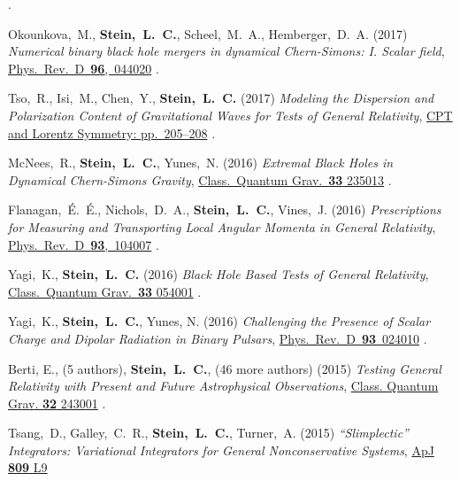 \begin{etaremune}[start=\value{pubCounter}]
  .
\item
  Okounkova,~M.,
  {\bf Stein,~L.~C.},
  Scheel,~M.~A.,
  Hemberger,~D.~A.
  (2017)
  {\it Numerical binary black hole mergers in dynamical Chern-Simons:
    I. Scalar field},
  \href{https://doi.org/10.1103/PhysRevD.96.044020}{Phys.~Rev.~D~{\bf 96},~044020}
  .
\item
  Tso,~R., Isi,~M., Chen,~Y., {\bf Stein,~L.~C.}
  (2017)
  {\it Modeling the Dispersion and Polarization Content of
    Gravitational Waves for Tests of General Relativity},
  \href{http://dx.doi.org/10.1142/9789813148505_0052}{CPT and Lorentz Symmetry: pp.~205--208}
  .
\item
  McNees,~R., {\bf Stein,~L.~C.}, Yunes,~N.
  (2016)
  {\it Extremal Black Holes in Dynamical Chern-Simons Gravity},
  \href{http://dx.doi.org/10.1088/0264-9381/33/23/235013}{Class.~Quantum Grav.~{\bf 33} 235013}
  .
\item
  Flanagan,~\'E.~\'E., Nichols,~D.~A., {\bf Stein,~L.~C.}, Vines,~J.
  (2016)
  {\it Prescriptions for Measuring and Transporting Local Angular
    Momenta in General Relativity},
  \href{http://dx.doi.org/10.1103/PhysRevD.93.104007}{Phys.~Rev.~D~{\bf 93},~104007}
  .
\item
  Yagi,~K., {\bf Stein,~L.~C.}
  (2016)
  {\it Black Hole Based Tests of General Relativity},
  \href{http://dx.doi.org/10.1088/0264-9381/33/5/054001}{Class.~Quantum Grav.~{\bf 33} 054001}
  .
\item
  Yagi,~K., {\bf Stein,~L.~C.}, Yunes, N.
  (2016)
  {\it Challenging the Presence of Scalar Charge and Dipolar Radiation
    in Binary Pulsars},
  \href{http://dx.doi.org/doi:10.1103/PhysRevD.93.024010}{Phys.~Rev.~D~{\bf 93}~024010}
  .
\item
  Berti, E., (5 authors), {\bf Stein,~L.~C.}, (46 more authors)
  (2015)
  {\it Testing General Relativity with Present and Future
    Astrophysical Observations},
  \href{http://dx.doi.org/10.1088/0264-9381/32/24/243001}{Class. Quantum Grav. {\bf 32} 243001}
  .
\item
  Tsang,~D., Galley,~C.~R., {\bf Stein,~L.~C.}, Turner,~A.
  (2015)
  {\it ``Slimplectic'' Integrators: Variational Integrators for General Nonconservative Systems},
  \href{http://dx.doi.org/10.1088/2041-8205/809/1/L9}{ApJ {\bf 809} L9}

\end{etaremune}
